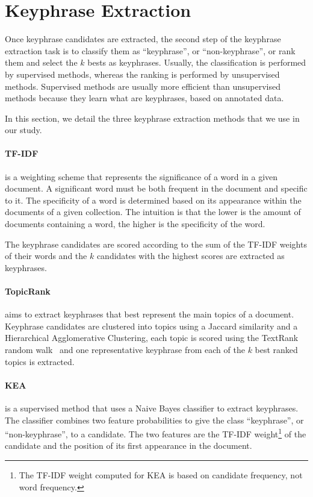 \section{Keyphrase Extraction}
\label{sec:keyphrase_extraction}
  Once keyphrase candidates are extracted, the second step of the keyphrase
  extraction task is to classify them as ``keyphrase'', or ``non-keyphrase'', or
  rank them and select the $k$ bests as keyphrases. Usually, the classification
  is performed by supervised methods, whereas the ranking is performed by
  unsupervised methods. Supervised methods are usually more efficient than
  unsupervised methods because they learn what are keyphrases, based on
  annotated data.

  In this section, we detail the three keyphrase extraction methods that we use
  in our study.

  \paragraph{TF-IDF~\textnormal{\cite{jones1972tfidf}}} is a weighting scheme
  that represents the significance of a word in a given document. A significant
  word must be both frequent in the document and specific to it. The specificity
  of a word is determined based on its appearance within the documents of a
  given collection. The intuition is that the lower is the amount of documents
  containing a word, the higher is the specificity of the word.

  The keyphrase candidates are scored according to the sum of the TF-IDF weights
  of their words and the $k$ candidates with the highest scores are extracted as
  keyphrases.

  \paragraph{TopicRank~\textnormal{\cite{bougouin2013topicrank}}} aims to
  extract keyphrases that best represent the main topics of a document.
  Keyphrase candidates are clustered into topics using a Jaccard similarity and
  a Hierarchical Agglomerative Clustering, each topic is scored using the
  TextRank random walk~\cite{mihalcea2004textrank} and one representative
  keyphrase from each of the $k$ best ranked topics is extracted.

  \paragraph{KEA~\textnormal{\cite{witten1999kea}}} is a supervised method that
  uses a Naive Bayes classifier to extract keyphrases. The classifier combines
  two feature probabilities to give the class ``keyphrase'', or
  ``non-keyphrase'', to a candidate. The two features are the TF-IDF
  weight\footnote{The TF-IDF weight computed for KEA is based on candidate
  frequency, not word frequency.} of the candidate and the position of its first
  appearance in the document.

